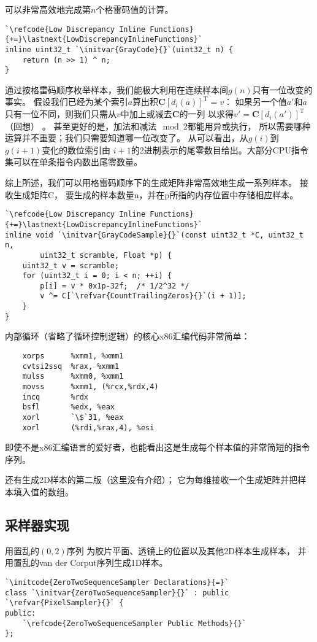 可以非常高效地完成第$n$个格雷码值的计算。
\begin{lstlisting}
`\refcode{Low Discrepancy Inline Functions}{+=}\lastnext{LowDiscrepancyInlineFunctions}`
inline uint32_t `\initvar{GrayCode}{}`(uint32_t n) {
    return (n >> 1) ^ n;
}
\end{lstlisting}

通过按格雷码顺序枚举样本，我们能极大利用在连续样本间$g(n)$只有一位改变的事实。
假设我们已经为某个索引$a$算出积${\bm C}[d_i(a)]^{\mathrm{T}}=v$：
如果另一个值$a'$和$a$只有一位不同，则我们只需从$v$中加上或减去$\bm C$的一列
以求得$v'={\bm C}[d_i(a')]^{\mathrm{T}}$（回想）
。
甚至更好的是，加法和减法$\mod{2}$都能用异或执行，
所以需要哪种运算并不重要；我们只需要知道哪一位改变了。
从可以看出，从$g(i)$到$g(i+1)$变化的数位索引由
$i+1$的2进制表示的尾零数目给出。大部分CPU指令集可以在单条指令内数出尾零数量。

综上所述，我们可以用格雷码顺序下的生成矩阵非常高效地生成一系列样本。
接收生成矩阵{\ttfamily C}，
要生成的样本数量{\ttfamily n}，并在{\ttfamily p}所指的内存位置中存储相应样本。
\begin{lstlisting}
`\refcode{Low Discrepancy Inline Functions}{+=}\lastnext{LowDiscrepancyInlineFunctions}`
inline void `\initvar{GrayCodeSample}{}`(const uint32_t *C, uint32_t n,
        uint32_t scramble, Float *p) {
    uint32_t v = scramble;
    for (uint32_t i = 0; i < n; ++i) {
        p[i] = v * 0x1p-32f;  /* 1/2^32 */
        v ^= C[`\refvar{CountTrailingZeros}{}`(i + 1)];
    }
}
\end{lstlisting}

内部循环（省略了循环控制逻辑）的核心x86汇编代码非常简单：
\begin{lstlisting}
    xorps      %xmm1, %xmm1
    cvtsi2ssq  %rax, %xmm1
    mulss      %xmm0, %xmm1
    movss      %xmm1, (%rcx,%rdx,4)
    incq       %rdx
    bsfl       %edx, %eax
    xorl       `\$`31, %eax
    xorl       (%rdi,%rax,4), %esi
\end{lstlisting}

即使不是x86汇编语言的爱好者，也能看出这是生成每个样本值的非常简短的指令序列。

还有生成2D样本的第二版（这里没有介绍）；
它为每维接收一个生成矩阵并把样本填入{}值的数组。

\subsection{采样器实现}\label{sub:采样器实现02}
用置乱的$(0,2)$序列
为胶片平面、透镜上的位置以及其他2D样本生成样本，
并用置乱的van der Corput序列生成1D样本。
\begin{lstlisting}
`\initcode{ZeroTwoSequenceSampler Declarations}{=}`
class `\initvar{ZeroTwoSequenceSampler}{}` : public `\refvar{PixelSampler}{}` {
public:
    `\refcode{ZeroTwoSequenceSampler Public Methods}{}`
};
\end{lstlisting}

